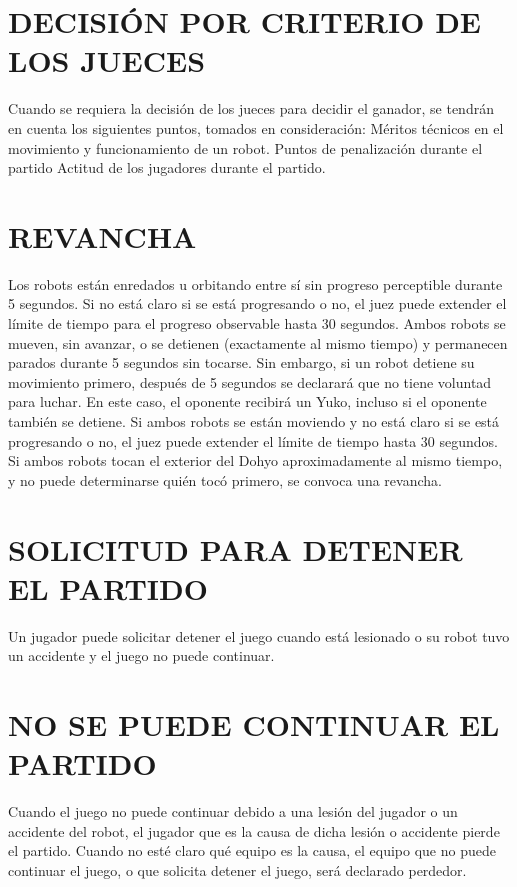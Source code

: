 \documentclass[
  letterpaper,
  DIV=11,
  numbers=noendperiod]{scrreprt}
\begin{document}
\section{DECISIÓN POR CRITERIO DE LOS
JUECES}\label{decisiuxf3n-por-criterio-de-los-jueces}

Cuando se requiera la decisión de los jueces para decidir el ganador, se
tendrán en cuenta los siguientes puntos, tomados en consideración:
Méritos técnicos en el movimiento y funcionamiento de un robot. Puntos
de penalización durante el partido Actitud de los jugadores durante el
partido.

\section{REVANCHA}\label{revancha}

Los robots están enredados u orbitando entre sí sin progreso perceptible
durante 5 segundos. Si no está claro si se está progresando o no, el
juez puede extender el límite de tiempo para el progreso observable
hasta 30 segundos. Ambos robots se mueven, sin avanzar, o se detienen
(exactamente al mismo tiempo) y permanecen parados durante 5 segundos
sin tocarse. Sin embargo, si un robot detiene su movimiento primero,
después de 5 segundos se declarará que no tiene voluntad para luchar. En
este caso, el oponente recibirá un Yuko, incluso si el oponente también
se detiene. Si ambos robots se están moviendo y no está claro si se está
progresando o no, el juez puede extender el límite de tiempo hasta 30
segundos. Si ambos robots tocan el exterior del Dohyo aproximadamente al
mismo tiempo, y no puede determinarse quién tocó primero, se convoca una
revancha.

\section{SOLICITUD PARA DETENER EL
PARTIDO}\label{solicitud-para-detener-el-partido}

Un jugador puede solicitar detener el juego cuando está lesionado o su
robot tuvo un accidente y el juego no puede continuar.

\section{NO SE PUEDE CONTINUAR EL
PARTIDO}\label{no-se-puede-continuar-el-partido}

Cuando el juego no puede continuar debido a una lesión del jugador o un
accidente del robot, el jugador que es la causa de dicha lesión o
accidente pierde el partido. Cuando no esté claro qué equipo es la
causa, el equipo que no puede continuar el juego, o que solicita detener
el juego, será declarado perdedor.
\end{document}
